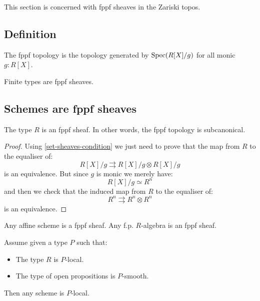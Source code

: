 This section is concerned with fppf sheaves in the Zariski topos.

\subsection{Definition}

\begin{definition}
The fppf topology is the topology generated by $\operatorname{Spec}(R[X]/g)$ for all monic $g:R[X]$.
\end{definition}

\begin{example}
Finite types are fppf sheaves.
\end{example}

\subsection{Schemes are fppf sheaves}

\begin{lemma}\label{fppf-subcanonical}
The type $R$ is an fppf sheaf. In other words, the fppf topology is subcanonical.
\end{lemma}

\begin{proof}
Using \cref{set-sheaves-condition} we just need to prove that the map from $R$ to the equaliser of:
\[R[X]/g \rightrightarrows R[X]/g \otimes R[X]/g\]
is an equivalence. But since $g$ is monic we merely have:
\[R[X]/g \simeq R^n\]
and then we check that the induced map from $R$ to the equaliser of:
\[R^n \rightrightarrows R^n\otimes R^n\]
is an equivalence.
\end{proof}

\begin{corollary}
Any affine scheme is a fppf sheaf. Any f.p. $R$-algebra is an fppf sheaf.
\end{corollary}

\begin{lemma}\label{scheme-are-sheaf-from-affine}
Assume given a type $P$ such that:
\begin{itemize}
\item The type $R$ is $P$-local.
\item The type of open propositions is $P$-smooth.
\end{itemize}
Then any scheme is $P$-local.
\end{lemma}

